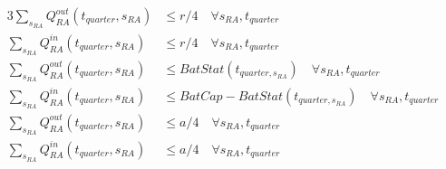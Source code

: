 \begin{alignat}{3}
	\sum_{s_{RA}} Q^{out}_{RA}(t_{quarter}, s_{RA}) & \leq r/4 \quad \forall s_{RA}, t_{quarter} \label{eq:RA_Q_out_r}                                    \\
	\sum_{s_{RA}} Q^{in}_{RA}(t_{quarter}, s_{RA})  & \leq r/4 \quad \forall s_{RA}, t_{quarter} \label{eq:RA_Q_in_r}                                     \\
	\sum_{s_{RA}} Q^{out}_{RA}(t_{quarter}, s_{RA}) & \leq BatStat(t_{quarter, s_{RA}}) \quad \forall s_{RA}, t_{quarter} \label{eq:RA_Q_out_Bat}         \\
	\sum_{s_{RA}} Q^{in}_{RA}(t_{quarter}, s_{RA})  & \leq BatCap - BatStat(t_{quarter, s_{RA}}) \quad \forall s_{RA}, t_{quarter} \label{eq:RA_Q_in_Bat} \\
	\sum_{s_{RA}} Q^{out}_{RA}(t_{quarter}, s_{RA}) & \leq a/4 \quad \forall s_{RA}, t_{quarter} \label{eq:RA_Q_out_a}                                    \\
	\sum_{s_{RA}} Q^{in}_{RA}(t_{quarter}, s_{RA})  & \leq a/4 \quad \forall s_{RA}, t_{quarter} \label{eq:RA_Q_in_a}
\end{alignat}

